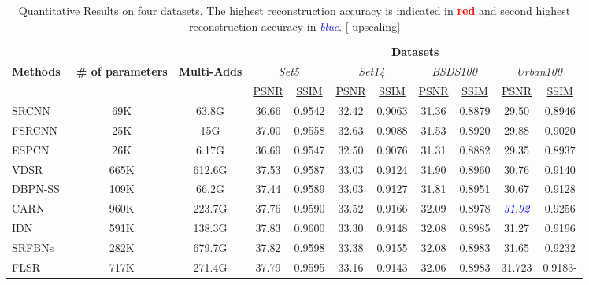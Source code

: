 \documentclass[a4paper,11pt]{article}
\begin{document}
\begin{table}[!ht]
\caption{Quantitative Results on four datasets. The highest reconstruction accuracy is indicated in \textbf{\textcolor{red}{red}} and second highest reconstruction accuracy in \textit{\textcolor{blue}{blue}}. [ upscaling]
	}
\begin{adjustbox}{width=\columnwidth,center}
		\begin{tabular}{l c c c|c||c|c||c|c||c|c}
\toprule
& &
&\multicolumn{8}{c}{\textbf{Datasets}}\\

			\cmidrule(l){4-11}
\multirow{2}{*}{\textbf{Methods}} & \multirow{2}{*}{\textbf{\# of parameters}} &\multirow{2}{*}{\textbf{Multi-Adds}} &
			\multicolumn{2}{c}{\textit{Set5}}
			&\multicolumn{2}{c}{\textit{Set14}}
			&\multicolumn{2}{c}{\textit{BSDS100}}
			&\multicolumn{2}{c}{\textit{Urban100}}
			\\
			\cmidrule(l){4-5}
			\cmidrule(l){6-7}
			\cmidrule(l){8-9}
			\cmidrule(l){10-11}
&
			&
			& \multicolumn{1}{c|}{\underline{PSNR}} & \multicolumn{1}{c||}{\underline{SSIM}} & \multicolumn{1}{c|}{\underline{PSNR}} & \multicolumn{1}{c||}{\underline{SSIM}}  &
			\multicolumn{1}{c|}{\underline{PSNR}} & \multicolumn{1}{c||}{\underline{SSIM}}  &\multicolumn{1}{c|}{\underline{PSNR}} & \multicolumn{1}{c}{\underline{SSIM}} \\	
SRCNN~\cite{SRCNN} & 69K & 63.8G & 36.66  & 0.9542 &  32.42 &  0.9063 &  31.36 &  0.8879 &  29.50 &  0.8946 \\
			FSRCNN~\cite{FSRCNN} & 25K & 15G &  37.00  & 0.9558 & 32.63 &  0.9088 &  31.53 &  0.8920 & 29.88 &  0.9020 \\	
			ESPCN~\cite{ESPCN} & 26K & 6.17G &  36.69  & 0.9547 & 32.50 &  0.9076 &  31.31 &  0.8882 & 29.35 &  0.8937 \\
			VDSR~\cite{VDSR} & 665K & 612.6G & 37.53  & 0.9587 & 33.03 &  0.9124 &  31.90 &  0.8960 & 30.76 &  0.9140 \\
			DBPN-SS~\cite{DBPN} & 109K & 66.2G & 37.44  & 0.9589 & 33.03 &  0.9127 &  31.81 &  0.8951 & 30.67 &  0.9128 \\
			CARN~\cite{CARN} & 960K & 223.7G &  37.76  & 0.9590 & 33.52 &  0.9166 &  32.09 &  0.8978 & \textit{\textcolor{blue}{31.92}} &  0.9256 \\	
			IDN~\cite{IDN} & 591K & 138.3G &  37.83  & 0.9600 & 33.30 &  0.9148 & 32.08 &  0.8985 &  31.27 &  0.9196 \\
			SRFBNs~\cite{SRFBN} & 282K & 679.7G &  37.82  & 0.9598 &  33.38 &  0.9155 &  32.08 &  0.8983 &  31.65 &  0.9232\\	
			FLSR~\cite{FLSR} & 717K & 271.4G & 37.79  & 0.9595  &  33.16 &  0.9143 & 32.06 &  0.8983 &  31.723 &  0.9183-\\



\end{tabular}
\end{adjustbox}
\end{table}
\end{document}
